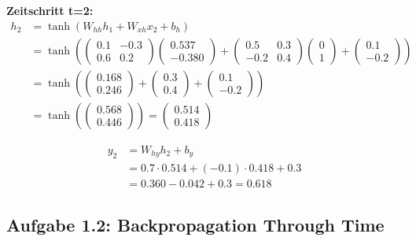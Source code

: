 ﻿\documentclass[12pt,a4paper]{article}
\begin{document}
\textbf{Zeitschritt t=2:}
\begin{align}
h_2 &= \tanh\left(W_{hh} h_1 + W_{xh} x_2 + b_h\right) \\
&= \tanh\left(\begin{pmatrix} 0.1 & -0.3 \\ 0.6 & 0.2 \end{pmatrix} \begin{pmatrix} 0.537 \\ -0.380 \end{pmatrix} + \begin{pmatrix} 0.5 & 0.3 \\ -0.2 & 0.4 \end{pmatrix} \begin{pmatrix} 0 \\ 1 \end{pmatrix} + \begin{pmatrix} 0.1 \\ -0.2 \end{pmatrix}\right) \\
&= \tanh\left(\begin{pmatrix} 0.168 \\ 0.246 \end{pmatrix} + \begin{pmatrix} 0.3 \\ 0.4 \end{pmatrix} + \begin{pmatrix} 0.1 \\ -0.2 \end{pmatrix}\right) \\
&= \tanh\left(\begin{pmatrix} 0.568 \\ 0.446 \end{pmatrix}\right) = \begin{pmatrix} 0.514 \\ 0.418 \end{pmatrix}
\end{align}

\begin{align}
y_2 &= W_{hy} h_2 + b_y \\
&= 0.7 \cdot 0.514 + (-0.1) \cdot 0.418 + 0.3 \\
&= 0.360 - 0.042 + 0.3 = 0.618
\end{align}


\subsection{Aufgabe 1.2: Backpropagation Through Time}
\end{document}
